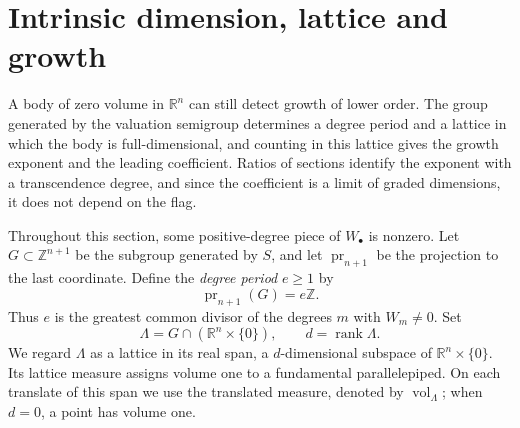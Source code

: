 \section{Intrinsic dimension, lattice and growth}

A body of zero volume in $\mathbb R^n$ can still detect growth of lower order. The group generated by the valuation semigroup determines a degree period and a lattice in which the body is full-dimensional, and counting in this lattice gives the growth exponent and the leading coefficient. Ratios of sections identify the exponent with a transcendence degree, and since the coefficient is a limit of graded dimensions, it does not depend on the flag.

Throughout this section, some positive-degree piece of $W_\bullet$ is nonzero. Let $G\subset\mathbb Z^{n+1}$ be the subgroup generated by $S$, and let $\operatorname{pr}_{n+1}$ be the projection to the last coordinate. Define the \emph{degree period} $e\geq1$ by
\[
 \operatorname{pr}_{n+1}(G)=e\mathbb Z.
\]
Thus $e$ is the greatest common divisor of the degrees $m$ with $W_m\neq0$. Set
\[
 \Lambda=G\cap(\mathbb R^n\times\{0\}),
 \qquad d=\operatorname{rank}\Lambda.
\]
We regard $\Lambda$ as a lattice in its real span, a $d$-dimensional subspace of $\mathbb R^n\times\{0\}$. Its lattice measure assigns volume one to a fundamental parallelepiped. On each translate of this span we use the translated measure, denoted by $\operatorname{vol}_\Lambda$; when $d=0$, a point has volume one.

